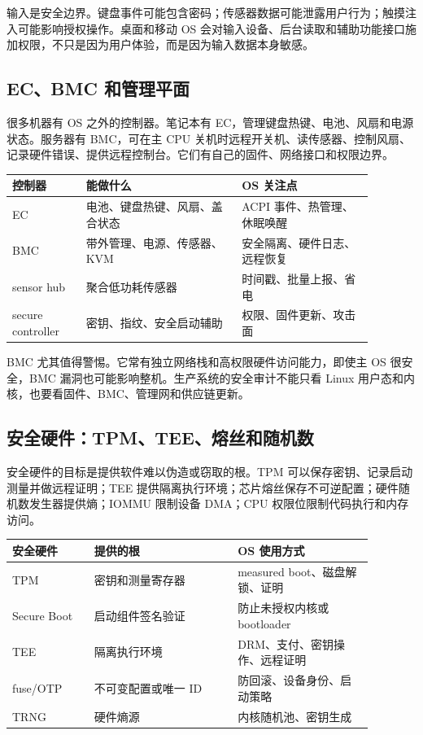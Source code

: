 输入是安全边界。键盘事件可能包含密码；传感器数据可能泄露用户行为；触摸注入可能影响授权操作。桌面和移动 OS 会对输入设备、后台读取和辅助功能接口施加权限，不只是因为用户体验，而是因为输入数据本身敏感。

\subsection{EC、BMC 和管理平面}

很多机器有 OS 之外的控制器。笔记本有 EC，管理键盘热键、电池、风扇和电源状态。服务器有 BMC，可在主 CPU 关机时远程开关机、读传感器、控制风扇、记录硬件错误、提供远程控制台。它们有自己的固件、网络接口和权限边界。

\begin{longtable}{p{0.18\linewidth}p{0.38\linewidth}p{0.32\linewidth}}
\toprule
控制器 & 能做什么 & OS 关注点 \\
\midrule
EC & 电池、键盘热键、风扇、盖合状态 & ACPI 事件、热管理、休眠唤醒 \\
BMC & 带外管理、电源、传感器、KVM & 安全隔离、硬件日志、远程恢复 \\
sensor hub & 聚合低功耗传感器 & 时间戳、批量上报、省电 \\
secure controller & 密钥、指纹、安全启动辅助 & 权限、固件更新、攻击面 \\
\bottomrule
\end{longtable}

BMC 尤其值得警惕。它常有独立网络栈和高权限硬件访问能力，即使主 OS 很安全，BMC 漏洞也可能影响整机。生产系统的安全审计不能只看 Linux 用户态和内核，也要看固件、BMC、管理网和供应链更新。

\subsection{安全硬件：TPM、TEE、熔丝和随机数}

安全硬件的目标是提供软件难以伪造或窃取的根。TPM 可以保存密钥、记录启动测量并做远程证明；TEE 提供隔离执行环境；芯片熔丝保存不可逆配置；硬件随机数发生器提供熵；IOMMU 限制设备 DMA；CPU 权限位限制代码执行和内存访问。

\begin{longtable}{p{0.2\linewidth}p{0.35\linewidth}p{0.33\linewidth}}
\toprule
安全硬件 & 提供的根 & OS 使用方式 \\
\midrule
TPM & 密钥和测量寄存器 & measured boot、磁盘解锁、证明 \\
Secure Boot & 启动组件签名验证 & 防止未授权内核或 bootloader \\
TEE & 隔离执行环境 & DRM、支付、密钥操作、远程证明 \\
fuse/OTP & 不可变配置或唯一 ID & 防回滚、设备身份、启动策略 \\
TRNG & 硬件熵源 & 内核随机池、密钥生成 \\
\bottomrule
\end{longtable}

